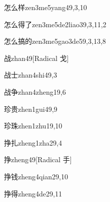 \begin{verbete}{怎么样}{zen3me5yang4}{9,3,10}
\end{verbete}

\begin{verbete}{怎么得了}{zen3me5de2liao3}{9,3,11,2}
\end{verbete}

\begin{verbete}{怎么搞的}{zen3me5gao3de5}{9,3,13,8}
\end{verbete}

\begin{verbete}{战}{zhan4}{9}[Radical 戈]
\end{verbete}

\begin{verbete}{战士}{zhan4shi4}{9,3}
\end{verbete}

\begin{verbete}{战争}{zhan4zheng1}{9,6}
\end{verbete}

\begin{verbete}{珍贵}{zhen1gui4}{9,9}
\end{verbete}

\begin{verbete}{珍珠}{zhen1zhu1}{9,10}
\end{verbete}

\begin{verbete}{挣扎}{zheng1zha2}{9,4}
\end{verbete}

\begin{verbete}{挣}{zheng4}{9}[Radical 手]
\end{verbete}

\begin{verbete}{挣钱}{zheng4qian2}{9,10}
\end{verbete}

\begin{verbete}{挣得}{zheng4de2}{9,11}
\end{verbete}

